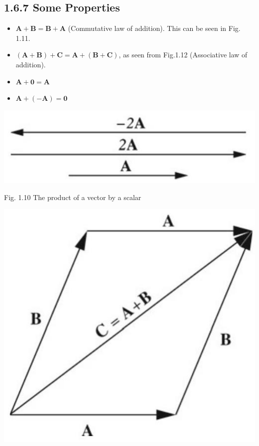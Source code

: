 \documentclass[10pt]{article}
\begin{document}
\subsection*{1.6.7 Some Properties}
\begin{itemize}
  \item $\mathbf{A}+\mathbf{B}=\mathbf{B}+\mathbf{A}$ (Commutative law of addition). This can be seen in Fig. 1.11.
  \item $(\mathbf{A}+\mathbf{B})+\mathbf{C}=\mathbf{A}+(\mathbf{B}+\mathbf{C})$, as seen from Fig.1.12 (Associative law of addition).
  \item $\mathbf{A}+\mathbf{0}=\mathbf{A}$
  \item $\mathbf{A}+(-\mathbf{A})=\mathbf{0}$
\end{itemize}

\begin{center}
\includegraphics[max width=\textwidth]{2024_09_13_db1f357d2aad0a03eb2eg-016}
\end{center}

Fig. 1.10 The product of a vector by a scalar

\begin{center}
\includegraphics[max width=\textwidth]{2024_09_13_db1f357d2aad0a03eb2eg-016(2)}
\end{center}
\end{document}

